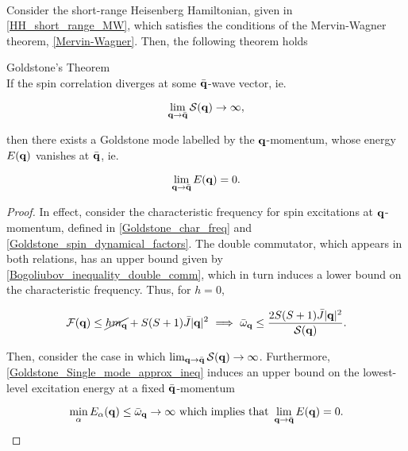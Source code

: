\blanky \\

Consider the short-range Heisenberg Hamiltonian, given in \cref{HH_short_range_MW}, which satisfies the conditions of the Mervin-Wagner theorem, \cref{Mervin-Wagner}. Then, the following theorem holds

\begin{theorem}\label{Goldstone_theo} Goldstone's Theorem \\

If the spin correlation diverges at some ${\bar{\bf q}}$-wave vector, ie.

$$
    \lim_{{\bf q} \rightarrow \bar{\bf q}} \mathcal{S}({\bf q}) \rightarrow \infty,
$$

then there exists a \textnormal{Goldstone mode} labelled by the ${\bf q}$-momentum, whose energy $E({\bf q})$ vanishes at ${\bar {\bf q}}$, ie.

$$
    \lim_{{\bf q} \rightarrow \bar{\bf q}} E({\bf q}) = 0.
$$

\end{theorem}

\begin{proof}

In effect, consider the characteristic frequency for spin excitations at ${\bf q}$-momentum, defined in \cref{Goldstone_char_freq} and \cref{Goldstone_spin_dynamical_factors}. The double commutator, which appears in both relations, has an upper bound given by \cref{Bogoliubov_inequality_double_comm}, which in turn induces a lower bound on the characteristic frequency. Thus, for $h=0$, 

\begin{equation}
    \mathcal{F}({\bf q}) \leq \cancel{h m_{{\bf q}}} + S(S+1) \bar{J} |{\bf q}|^2 \textnormal{ } \Longrightarrow \textnormal{ } \bar{\omega}_{{\bf q}} \leq \frac{2S(S+1) \bar{J} |{\bf q}|^2}{\mathcal{S}({\bf q})}.
\end{equation}

Then, consider the case in which $\lim_{{\bf q} \rightarrow \bar{\bf q}} \mathcal{S}({\bf q}) \rightarrow \infty$. Furthermore, \cref{Goldstone_Single_mode_approx_ineq} induces an upper bound on the lowest-level excitation energy at a fixed $\bar{\bf q}$-momentum  

$$    
\min_{\alpha} E_{\alpha}({\bf q}) \leq \bar{\omega}_{{\bf q}} \rightarrow \infty \textnormal{ which implies that } \lim_{{\bf q} \rightarrow \bar{\bf q}} E({\bf q}) = 0.
$$
\end{proof}

